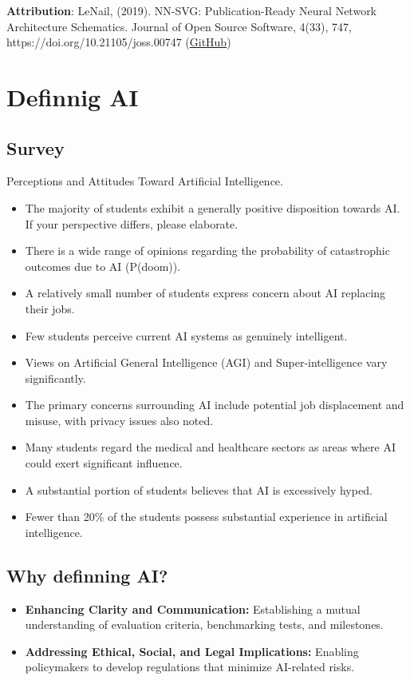 \documentclass[
  letterpaper,
  DIV=11,
  numbers=noendperiod]{scrartcl}
\providecommand{\tightlist}{%
  \setlength{\itemsep}{0pt}\setlength{\parskip}{0pt}}
\begin{document}
\textbf{Attribution}: LeNail, (2019). NN-SVG: Publication-Ready Neural
Network Architecture Schematics. Journal of Open Source Software, 4(33),
747, https://doi.org/10.21105/joss.00747
(\href{https://github.com/alexlenail/NN-SVG}{GitHub})

\section{Definnig AI}\label{definnig-ai}

\subsection{Survey}\label{survey}

Perceptions and Attitudes Toward Artificial Intelligence.

\begin{itemize}
\tightlist
\item
  The majority of students exhibit a generally positive disposition
  towards AI. If your perspective differs, please elaborate.
\item
  There is a wide range of opinions regarding the probability of
  catastrophic outcomes due to AI (P(doom)).
\item
  A relatively small number of students express concern about AI
  replacing their jobs.
\item
  Few students perceive current AI systems as genuinely intelligent.
\item
  Views on Artificial General Intelligence (AGI) and Super-intelligence
  vary significantly.
\item
  The primary concerns surrounding AI include potential job displacement
  and misuse, with privacy issues also noted.
\item
  Many students regard the medical and healthcare sectors as areas where
  AI could exert significant influence.
\item
  A substantial portion of students believes that AI is excessively
  hyped.
\item
  Fewer than 20\% of the students possess substantial experience in
  artificial intelligence.
\end{itemize}

\subsection{Why definning AI?}\label{why-definning-ai}

\begin{itemize}
\item
  \textbf{Enhancing Clarity and Communication:} Establishing a mutual
  understanding of evaluation criteria, benchmarking tests, and
  milestones.
\item
  \textbf{Addressing Ethical, Social, and Legal Implications:} Enabling
  policymakers to develop regulations that minimize AI-related risks.
\end{itemize}
\end{document}
